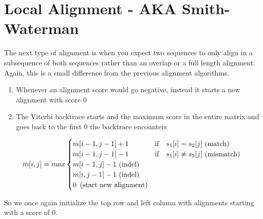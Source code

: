 \documentclass[11pt]{article}
\begin{document}
\section*{Local Alignment - AKA Smith-Waterman}


The next type of alignment is when you expect two sequences to only align in a subsequence of both sequences rather than an overlap or a full length alignment. Again, this is a small difference from the previous alignment algorithms.
\begin{enumerate}
\item Whenever an alignment score would go negative, instead it starts a new alignment with score 0
\item The Viterbi backtrace starts and the maximum score in the entire matrix and goes back to the first 0 the backtrace encounters
\end{enumerate}

\begin{equation*}
m[i,j] = max
\begin{cases}
      m[i-1,j-1] + 1 & \text{if \,\, } s_1[i] = s_2[j] \text{ (match)} \\
      m[i-1,j-1] - 1 &  \text{if \,\, } s_1[i] \neq s_2[j] \text{ (mismatch)} \\
      m[i-1,j] - 1 \text{ (indel)} \\
      m[i,j-1] - 1 \text{ (indel)} \\
      0 \text{\,\,\,(start new alignment)}\\
\end{cases}
\end{equation*}

So we once again initialize the top row and left column with alignments starting with a score of 0.

\noindent
{} \\
\end{document}
